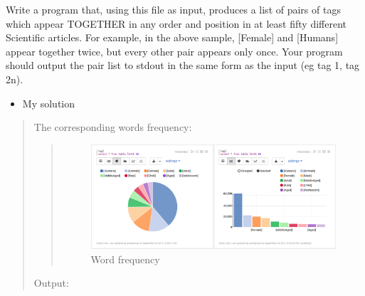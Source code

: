 \documentclass[letterpaper,11pt,english]{sphinxmanual}
\begin{document}
Write a program that, using this file as input, produces a list of pairs of
tags which appear TOGETHER in any order and position in at least fifty different Scientific articles. For
example, in the above sample, {[}Female{]} and {[}Humans{]} appear together
twice, but every other pair appears only once. Your program should output
the pair list to stdout in the same form as the input (eg tag 1,
tag 2n).
\begin{itemize}
\item {} 
My solution

\end{itemize}
\begin{quote}

The corresponding words frequency:
\begin{quote}
\begin{figure}[htbp]
\centering
\capstart

\includegraphics{freq_word_ze.png}
\caption{Word frequency}\label{socialnetwork:fig-wordfreq-ze}\end{figure}
\end{quote}

Output:


\end{quote}
\end{document}
